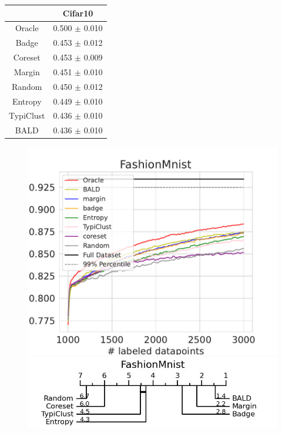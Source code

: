 \documentclass[]{article}
\begin{document}
\begin{minipage}{0.29\linewidth}
\begin{tabular}{c|c}
&Cifar10\\
\hline
Oracle&0.500 $\pm$ 0.010\\
Badge&0.453 $\pm$ 0.012\\
Coreset&0.453 $\pm$ 0.009\\
Margin&0.451 $\pm$ 0.010\\
Random&0.450 $\pm$ 0.012\\
Entropy&0.449 $\pm$ 0.010\\
TypiClust&0.436 $\pm$ 0.010\\
BALD&0.436 $\pm$ 0.010\\
\end{tabular}
\end{minipage}
\begin{minipage}{0.65\linewidth}
\begin{figure}[H]
    \centering
    \includegraphics[width=\linewidth]{img/eval_fmnist}\\ [2mm]
    \includegraphics[width=\linewidth]{img/micro_fmnist.jpg}
\end{figure}
\end{minipage}
\end{document}
